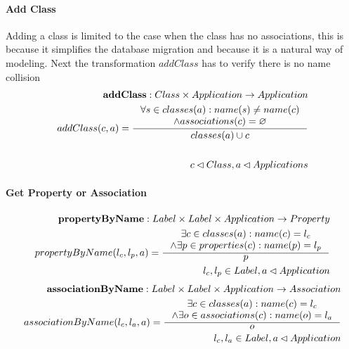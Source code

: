 \documentclass[11pt]{article}
\begin{document}
\paragraph{Add Class} Adding a class is limited to the case when the class has no associations, this is because it simplifies the database migration and because it is a natural way of modeling. Next the transformation $addClass$ has to verify there is no name collision
\begin{align*}
	\mathbf{addClass} : Class \times Application \rightarrow Application \\ 
	addClass(c, a) = \inference{\forall s \in classes(a) : name(s) \neq name(c) \\ \wedge associations(c) = \varnothing }{classes(a) \cup c} \\ \\
	c \lhd Class, a \lhd Applications
\end{align*}

\paragraph{Get Property or Association}
\begin{align*}
	\mathbf{propertyByName} : Label \times Label \times Application \rightarrow Property \\
	propertyByName(l_c, l_p, a) = \inference{\exists c \in classes(a): name(c) = l_c \\ \wedge \exists p \in properties(c) : name(p) = l_p}{p} \\
	l_c, l_p \in Label, a \lhd Application
\end{align*}
\begin{align*}
	\mathbf{associationByName} : Label \times Label \times Application \rightarrow Association \\
	associationByName(l_c, l_a, a) = \inference{\exists c \in classes(a): name(c) = l_c \\ \wedge \exists o \in associations(c) : name(o) = l_a}{o} \\
	l_c, l_a \in Label, a \lhd Application
\end{align*}
\end{document}
